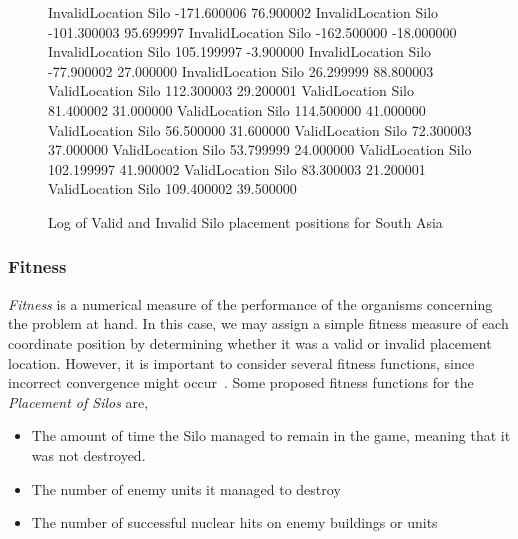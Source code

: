         \begin{figure}[htp]
        \begin{center}        
        \begin{listing}{1}               
        InvalidLocation	Silo	-171.600006	76.900002
        InvalidLocation	Silo	-101.300003	95.699997
        InvalidLocation	Silo	-162.500000	-18.000000
        InvalidLocation	Silo	105.199997	-3.900000
        InvalidLocation	Silo	-77.900002	27.000000
        InvalidLocation	Silo	26.299999	88.800003
        ValidLocation	Silo	112.300003	29.200001
        ValidLocation	Silo	81.400002	31.000000
        ValidLocation	Silo	114.500000	41.000000
        ValidLocation	Silo	56.500000	31.600000
        ValidLocation	Silo	72.300003	37.000000 
        ValidLocation	Silo	53.799999	24.000000
        ValidLocation	Silo	102.199997	41.900002
        ValidLocation	Silo	83.300003	21.200001
        ValidLocation	Silo	109.400002	39.500000
        \end{listing}        
        \end{center}        
        \caption{Log of Valid and Invalid Silo placement positions for South Asia}
        \label{img:silolog}
        \end{figure}
        
        \subsubsection{Fitness}  
        
        \emph{Fitness} is a numerical measure of the performance of the organisms concerning the problem at hand. In this case, we may assign a simple fitness measure of each coordinate position by determining whether it was a valid or invalid placement location. However, it is important to consider several fitness functions, since incorrect convergence might occur~\cite{yaochu}. Some proposed fitness functions for the \emph{Placement of Silos} are,
                
        \begin{itemize}
        \item The amount of time the Silo managed to remain in the game, meaning that it was not destroyed.
        \item The number of enemy units it managed to destroy
        \item The number of successful nuclear hits on enemy buildings or units
        \end{itemize}
        
